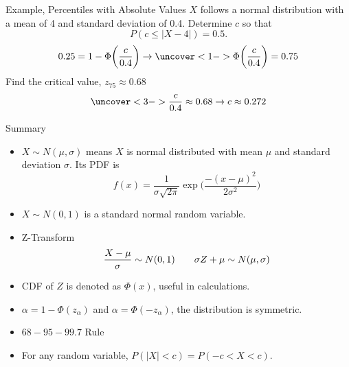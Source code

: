 \documentclass[handout]{beamer}
\begin{document}
\begin{frame}{Example, Percentiles with Absolute Values}
    $X$ follows a normal distribution with a mean of 4 and standard deviation of 0.4. Determine $c$ so that 
    $$P(c \leq |X-4|)=0.5.$$    
    $$0.25 = 1 -  \Phi\bigg( \frac{c}{0.4} \bigg) \to \uncover<1->{\Phi\bigg( \frac{c}{0.4} \bigg) =0.75}$$
     {Find the critical value, $z_{75}\approx 0.68$}
    $$ \uncover<3->{\frac{c}{0.4} \approx 0.68 \to c \approx 0.272 }$$
\end{frame}
\begin{frame}{Summary}
    \begin{itemize}
        \item $X\sim N(\mu,\sigma)$ means $X$ is normal distributed with mean $\mu$ and standard deviation $\sigma$. Its PDF is
        $$ f(x) = \frac{1}{\sigma\sqrt{2\pi}} \exp\bigg( \frac{-(x-\mu)^2}{2 \sigma^2} \bigg) $$
        \item $X\sim N(0,1)$ is a standard normal random variable.
        \item Z-Transform
        $$ \frac{X-\mu}{\sigma} \sim N(0,1) \hskip 2em \sigma Z + \mu \sim N(\mu,\sigma) $$
        \item CDF of $Z$ is denoted as $\Phi(x)$, useful in calculations.
        \item $\alpha = 1 - \Phi(z_{\alpha})$ and  $\alpha = \Phi(-z_{\alpha})$, the distribution is symmetric.
        \item $68-95-99.7$ Rule
        \item For any random variable, $P(|X|<c) = P(-c < X < c)$.
    \end{itemize}
\end{frame}
\end{document}
